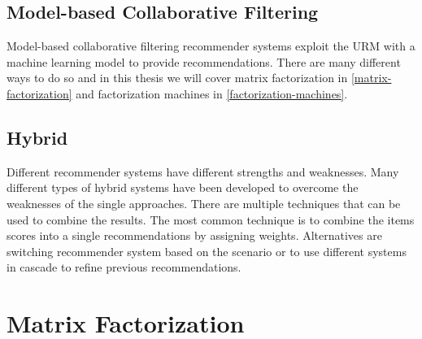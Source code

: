 \subsection{Model-based Collaborative Filtering}

Model-based collaborative filtering recommender systems exploit the URM with a machine learning model to provide recommendations. There are many different ways to do so and in this thesis we will cover matrix factorization in \autoref{matrix-factorization} and factorization machines in \autoref{factorization-machines}.


\subsection{Hybrid}

Different recommender systems have different strengths and weaknesses. Many different types of hybrid systems have been developed to overcome the weaknesses of the single approaches. There are multiple techniques that can be used to combine the results. The most common technique is to combine the items scores into a single recommendations by assigning weights. Alternatives are switching recommender system based on the scenario or to use different systems in cascade to refine previous recommendations.



\section{Matrix Factorization}
\label{matrix-factorization}

